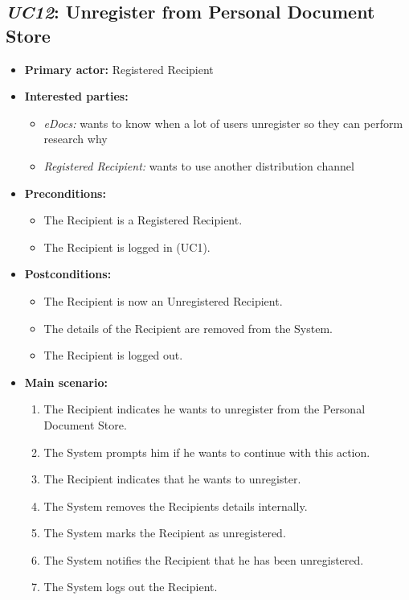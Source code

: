 \documentclass[a4paper,10pt]{article}
\begin{document}
\subsection{\emph{UC12}: Unregister from Personal Document Store}
\begin{itemize}
    \item \textbf{Primary actor:} Registered Recipient
    \item \textbf{Interested parties:} 
        \begin{itemize}
            \item \textit{eDocs:} wants to know when a lot of users unregister so they can perform research why
            \item \textit{Registered Recipient:} wants to use another distribution channel
        \end{itemize}

    \item \textbf{Preconditions:}
        \begin{itemize}
            \item The Recipient is a Registered Recipient.
            \item The Recipient is logged in (UC1).
        \end{itemize}

    \item \textbf{Postconditions:}
        \begin{itemize}
            \item The Recipient is now an Unregistered Recipient.
            \item The details of the Recipient are removed from the System.
            \item The Recipient is logged out.
        \end{itemize}
        
    \item \textbf{Main scenario:} 
    \begin{enumerate}
       \item The Recipient indicates he wants to unregister from the Personal Document Store.
       \item The System prompts him if he wants to continue with this action.
       \item The Recipient indicates that he wants to unregister.
       \item The System removes the Recipients details internally.
       \item The System marks the Recipient as unregistered.
       \item The System notifies the Recipient that he has been unregistered.
       \item The System logs out the Recipient.
    \end{enumerate}


\end{itemize}
\end{document}
